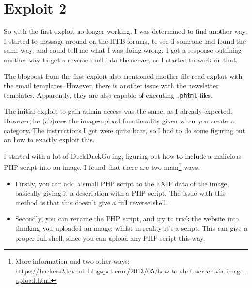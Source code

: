 \chapter{Exploit 2}
\label{chap:exploit2}

So with the first exploit no longer working, I was determined to find another way. I started to message around on the HTB forums, to see if someone had found the same way; and could tell me what I was doing wrong. I got a response outlining another way to get a reverse shell into the server, so I started to work on that.

\vspace{3mm}

The blogpost from the first exploit also mentioned another file-read exploit with the email templates. However, there is another issue with the newsletter templates. Apparently, they are also capable of executing \verb|.phtml| files.

The initial exploit to gain admin access was the same, as I already expected. However, he (ab)uses the image-upload functionality given when you create a category. The instructions I got were quite bare, so I had to do some figuring out on how to exactly exploit this.

\vspace{3mm}

I started with a lot of DuckDuckGo-ing, figuring out how to include a malicious PHP script into an image. I found that there are two main\footnote{More information and two other ways: \\\url{https://hackers2devnull.blogspot.com/2013/05/how-to-shell-server-via-image-upload.html}} ways:

\begin{itemize}
    \item Firstly, you can add a small PHP script to the EXIF data of the image, basically giving it a description with a PHP script. The issue with this method is that this doesn't give a full reverse shell.
    \item Secondly, you can rename the PHP script, and try to trick the website into thinking you uploaded an image; whilst in reality it's a script. This can give a proper full shell, since you can upload any PHP script this way.
\end{itemize}

